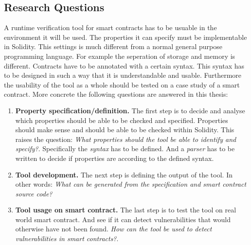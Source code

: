 \documentclass[a4paper]{article}
\begin{document}
\subsection{Research Questions}
A runtime verification tool for smart contracts has to be usuable in the environment it will be used. The properties it can specify must be implementable in Solidity. This settings is much different from a normal general purpose programming language. For example the seperation of storage and memory is different. Contracts have to be annotated with a certain syntax. This syntax has to be designed in such a way that it is understandable and usable. Furthermore the usability of the tool as a whole should be tested on a case study of a smart contract.
More concrete the following questions are answered in this thesis:
\begin{enumerate}
\item \textbf{Property specification/definition.}
The first step is to decide and analyse which properties should be able to be checked and specified. Properties should make sense and should be able to be checked within Solidity. This raises the question:
\textit{What properties should the tool be able to identify and specify?}. Specifically the \textit{syntax} has to be defined. And a \textit{parser} has to be written to decide if properties are according to the defined syntax. 
\item \textbf{Tool development.}
The next step is defining the output of the tool. In other words: \textit{What can be generated from the specification and smart contract source code?}
\item \textbf{Tool usage on smart contract.}
The last step is to test the tool on real world smart contract. And see if it can detect vulnerabilities that would otherwise have not been found. \textit{How can the tool be used to detect vulnerabilities in smart contracts?}.
\end{enumerate}
\end{document}
